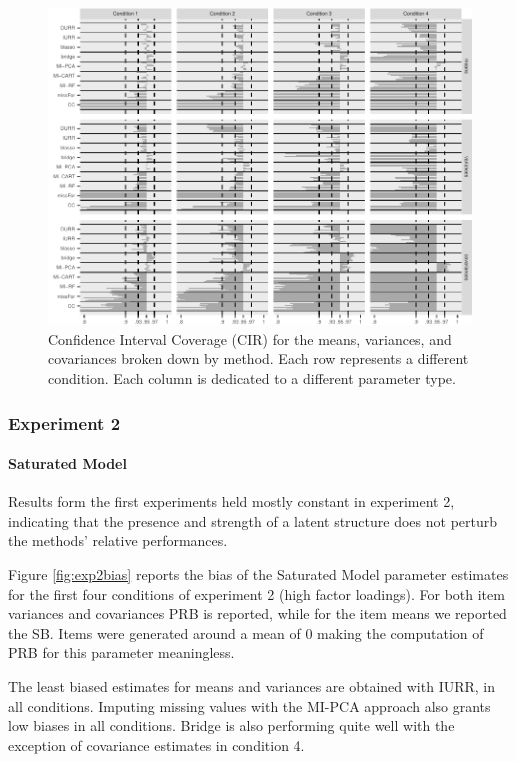 \begin{figure}
	\includegraphics[width=\textwidth]{../../output/graphs/exp1_CI.pdf}
\caption{Confidence Interval Coverage (CIR) for the means, variances, and covariances broken 
	down by method. 
	Each row represents a different condition. 
	Each column is dedicated to a different parameter type.}
\label{fig:exp1cir}
\end{figure}
	
\FloatBarrier %

\subsubsection{Experiment 2}

\paragraph{Saturated Model}

	Results form the first experiments held mostly constant in experiment 2, indicating that the presence and 
	strength of a latent structure does not perturb the methods' relative performances.

	Figure \ref{fig:exp2bias} reports the bias of the Saturated Model parameter estimates for the first
	four conditions of experiment 2 (high factor loadings). 
	For both item variances and covariances PRB is reported, while for the item means we reported the SB. 
	Items were generated around a mean of 0 making the computation of PRB for this parameter meaningless.

	The least biased estimates for means and variances are obtained with IURR, in all conditions.
	Imputing missing values with the MI-PCA approach also grants low biases in all conditions.
	Bridge is also performing quite well with the exception of covariance estimates in condition 4.


